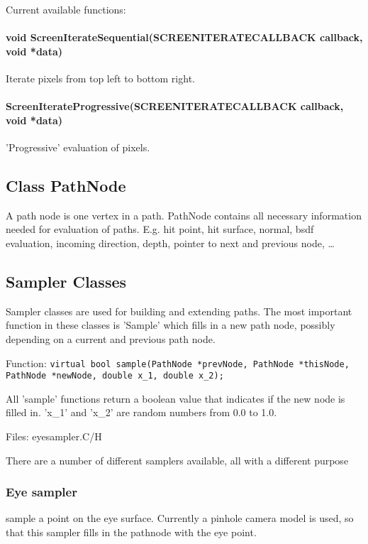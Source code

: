 \documentclass[11pt]{report}
\begin{document}
Current available functions:

\paragraph{void ScreenIterateSequential(SCREENITERATECALLBACK callback, void *data)}

Iterate pixels from top left to bottom right.

\paragraph{ScreenIterateProgressive(SCREENITERATECALLBACK callback, 
			      void *data)}

'Progressive' evaluation of pixels. 


\subsection{Class PathNode}

A path node is one vertex in a path. PathNode contains
all necessary information needed for evaluation of paths.
E.g. hit point, hit surface, normal, bsdf evaluation,
incoming direction, depth, pointer to next and previous node, \ldots

\subsection{Sampler Classes}

Sampler classes are used for building and extending paths.
The most important function in these classes is 'Sample'
which fills in a new path node, possibly depending on a
current and previous path node.

Function:
{\tt virtual bool sample(PathNode *prevNode, PathNode *thisNode,
  PathNode *newNode, double x\_1, double x\_2); }


All 'sample' functions return a boolean value that indicates if
the new node is filled in. 'x\_1' and 'x\_2' are random numbers from
0.0 to 1.0.

Files: eyesampler.C/H


There are a number of different samplers available, all with
a different purpose


\subsubsection{Eye sampler}

sample a point on the eye surface. Currently a pinhole
camera model is used, so that this sampler fills in the pathnode
with the eye point.
\end{document}
